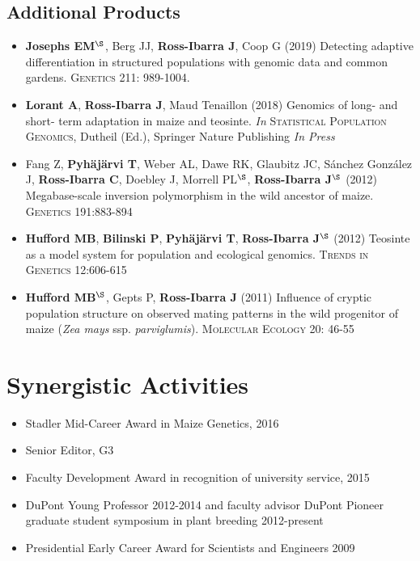\documentclass[10pt]{article}
\begin{document}
\subsection*{Additional Products}

\begin{itemize} \setlength{\itemsep}{0pt} \setlength{\parskip}{2pt} \setlength{\parsep}{0pt}

\item \textbf{Josephs EM}$^\S$, Berg JJ, \textbf{Ross-Ibarra J}, Coop G (2019) Detecting adaptive differentiation in structured populations with genomic data and common gardens. \textsc{Genetics} 211: 989-1004.

\item \textbf{Lorant A}, \textbf{Ross-Ibarra J}, Maud Tenaillon (2018) Genomics of long- and short- term adaptation in maize and teosinte. \textit{In} \textsc{Statistical Population Genomics},  Dutheil (Ed.), Springer Nature Publishing \textit{In Press}

\item Fang Z, {\bf Pyh\"aj\"arvi T}, Weber AL, Dawe RK, Glaubitz JC, S\'{a}nchez Gonz\'{a}lez J, {\bf Ross-Ibarra C}, Doebley J, Morrell PL$^\S$, {\bf Ross-Ibarra J}$^\S$  (2012) Megabase-scale inversion polymorphism in the wild ancestor of maize. \textsc{Genetics} 191:883-894

\item {\bf Hufford MB}, {\bf Bilinski P}, {\bf Pyh\"aj\"arvi T}, {\bf Ross-Ibarra J}$^\S$ (2012) Teosinte as a model system for population and ecological genomics. \textsc{Trends in Genetics} 12:606-615

\item {\bf Hufford MB}$^\S$, Gepts P, {\bf Ross-Ibarra J} (2011) Influence of cryptic population structure on observed mating patterns in the wild progenitor of maize (\emph{Zea mays} ssp. \emph{parviglumis}).  \textsc{Molecular Ecology} 20: 46-55


\end{itemize}

\section{Synergistic Activities}

\begin{itemize} \setlength{\itemsep}{0pt} \setlength{\parskip}{2pt} \setlength{\parsep}{0pt}
\item Stadler Mid-Career Award in Maize Genetics, 2016
\item Senior Editor, G3
\item Faculty Development Award in recognition of university service, 2015
\item DuPont Young Professor 2012-2014 and faculty advisor DuPont Pioneer graduate student symposium in plant breeding 2012-present
\item Presidential Early Career Award for Scientists and Engineers 2009
\end{itemize}
\end{document}
